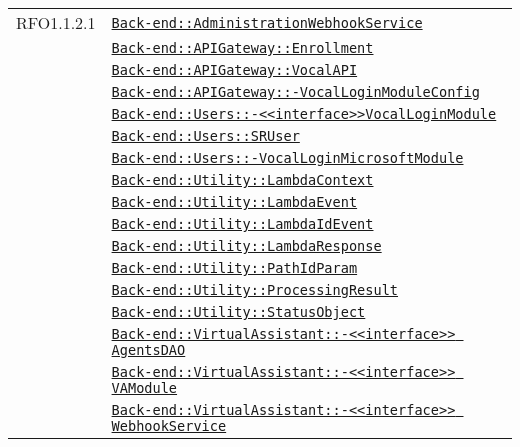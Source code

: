 \begin{longtable}{|>{\centering}m{3cm}|m{10cm}<{\centering}|}
RFO1.1.2.1 & \hyperref[Back-end::AdministrationWebhookService]{\texttt{Back-end::AdministrationWebhookService}}\\
& \hyperref[Back-end::APIGateway::Enrollment]{\texttt{Back-end::APIGateway::Enrollment}}\\
& \hyperref[Back-end::APIGateway::VocalAPI]{\texttt{Back-end::APIGateway::VocalAPI}}\\
& \hyperref[Back-end::APIGateway::VocalLoginModuleConfig]{\texttt{Back-end::APIGateway::-\linebreak VocalLoginModuleConfig}}\\
& \hyperref[Back-end::Users::<<interface>>VocalLoginModule]{\texttt{Back-end::Users::-\linebreak <<interface>>VocalLoginModule}}\\
& \hyperref[Back-end::Users::SRUser]{\texttt{Back-end::Users::SRUser}}\\
& \hyperref[Back-end::Users::VocalLoginMicrosoftModule]{\texttt{Back-end::Users::-\linebreak VocalLoginMicrosoftModule}}\\
& \hyperref[Back-end::Utility::LambdaContext]{\texttt{Back-end::Utility::LambdaContext}}\\
& \hyperref[Back-end::Utility::LambdaEvent]{\texttt{Back-end::Utility::LambdaEvent}}\\
& \hyperref[Back-end::Utility::LambdaIdEvent]{\texttt{Back-end::Utility::LambdaIdEvent}}\\
& \hyperref[Back-end::Utility::LambdaResponse]{\texttt{Back-end::Utility::LambdaResponse}}\\
& \hyperref[Back-end::Utility::PathIdParam]{\texttt{Back-end::Utility::PathIdParam}}\\
& \hyperref[Back-end::Utility::ProcessingResult]{\texttt{Back-end::Utility::ProcessingResult}}\\
& \hyperref[Back-end::Utility::StatusObject]{\texttt{Back-end::Utility::StatusObject}}\\
& \hyperref[Back-end::VirtualAssistant::<<interface>> AgentsDAO]{\texttt{Back-end::VirtualAssistant::-\linebreak <<interface>> AgentsDAO}}\\
& \hyperref[Back-end::VirtualAssistant::<<interface>> VAModule]{\texttt{Back-end::VirtualAssistant::-\linebreak <<interface>> VAModule}}\\
& \hyperref[Back-end::VirtualAssistant::<<interface>> WebhookService]{\texttt{Back-end::VirtualAssistant::-\linebreak <<interface>> WebhookService}}\\

\end{longtable}
